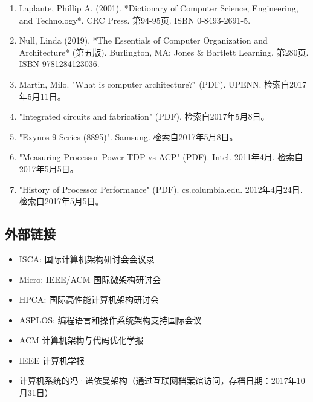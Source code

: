 \begin{enumerate}
\item Laplante, Phillip A. (2001). *Dictionary of Computer Science, Engineering, and Technology*. CRC Press. 第94-95页. ISBN 0-8493-2691-5.  
\item Null, Linda (2019). *The Essentials of Computer Organization and Architecture* (第五版). Burlington, MA: Jones & Bartlett Learning. 第280页. ISBN 9781284123036.  
\item Martin, Milo. "What is computer architecture?" (PDF). UPENN. 检索自2017年5月11日。  
\item "Integrated circuits and fabrication" (PDF). 检索自2017年5月8日。  
\item "Exynos 9 Series (8895)". Samsung. 检索自2017年5月8日。  
\item "Measuring Processor Power TDP vs ACP" (PDF). Intel. 2011年4月. 检索自2017年5月5日。  
\item "History of Processor Performance" (PDF). cs.columbia.edu. 2012年4月24日. 检索自2017年5月5日。  
\end{enumerate}
\subsection{外部链接}
\begin{itemize}
\item ISCA: 国际计算机架构研讨会会议录  
\item Micro: IEEE/ACM 国际微架构研讨会  
\item HPCA: 国际高性能计算机架构研讨会  
\item ASPLOS: 编程语言和操作系统架构支持国际会议  
\item ACM 计算机架构与代码优化学报  
\item IEEE 计算机学报  
\item 计算机系统的冯·诺依曼架构（通过互联网档案馆访问，存档日期：2017年10月31日）
\end{itemize}